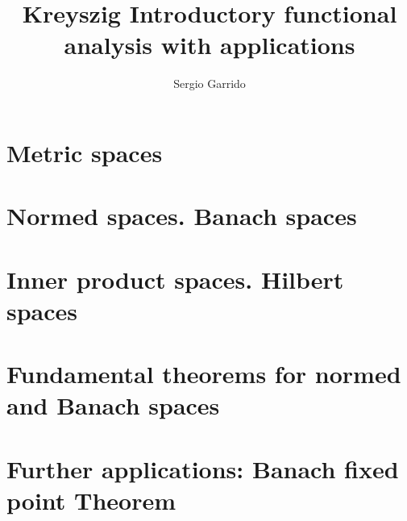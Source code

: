 \documentclass{bookSolutions}
\title{Kreyszig  Introductory functional analysis with applications}
\author{Sergio Garrido}
\begin{document}
\maketitle

\tableofcontents

\chapter{Metric spaces}







\chapter{Normed spaces. Banach spaces}











\chapter{Inner product spaces. Hilbert spaces}











\chapter{Fundamental theorems for normed and Banach spaces}














\chapter{Further applications: Banach fixed point Theorem}




\end{document}
